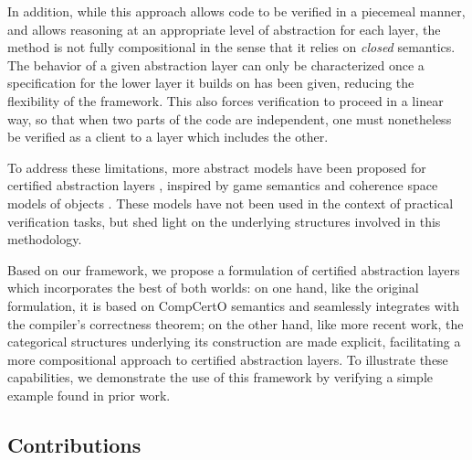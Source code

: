 \documentclass[acmsmall,screen,review,anonymous]{acmart}
\begin{document}
%

In addition,
while this approach allows code
to be verified in a piecemeal manner,
and allows reasoning at an appropriate level of abstraction
for each layer,
the method is not fully compositional
in the sense that it relies on \emph{closed} semantics.
The behavior of a given abstraction layer
can only be characterized
once a specification for the lower layer it builds on has been given,
reducing the flexibility of the framework.
This also forces verification to proceed
in a linear way,
so that when two parts of the code
are independent,
one must nonetheless be verified
as a client to a layer which includes the other.

To address these limitations,
more abstract models have been proposed
for certified abstraction layers
\cite{rbgs-cal,popl22},
inspired by game semantics and
coherence space models of objects \cite{objsem}.
These models have not been used
in the context of practical verification tasks,
but shed light on the underlying structures
involved in this methodology.

Based on our framework,
we propose a formulation of certified abstraction layers
which incorporates the best of both worlds:
on one hand,
like the original formulation,
it is based on CompCertO semantics
and seamlessly integrates
with the compiler's correctness theorem;
on the other hand,
like more recent work,
the categorical structures underlying its construction
are made explicit,
facilitating a more compositional approach
to certified abstraction layers.
To illustrate these capabilities,
we demonstrate the use of this framework
by verifying a simple example
found in prior work.


\subsection{Contributions} %
\end{document}
